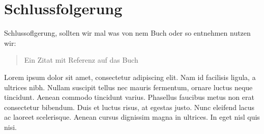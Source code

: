 \documentclass[aps,twocolumn,secnumarabic,nobalancelastpage,amsmath,amssymb,
nofootinbib,superscriptaddress]{revtex4-1}
\begin{document}
\begin{figure}[t!]
  \centering
\end{figure}





\section{Schlussfolgerung}

Schlussoflgerung, sollten wir mal was von nem Buch oder so entnehmen nutzen wir:


\begin{quote}
  Ein Zitat mit Referenz auf das Buch\cite{melissinos1966}
\end{quote}

Lorem ipsum dolor sit amet, consectetur adipiscing elit. Nam id facilisis ligula,
a ultrices nibh. Nullam suscipit tellus nec mauris fermentum, ornare luctus neque
tincidunt. Aenean commodo tincidunt varius. Phasellus faucibus metus non erat
consectetur bibendum. Duis et luctus risus, at egestas justo. Nunc eleifend lacus
ac laoreet scelerisque. Aenean cursus dignissim magna in ultrices. In eget nisl
quis nisi.
\end{document}
